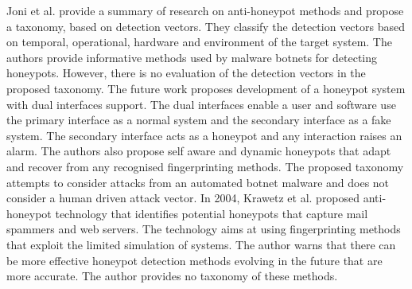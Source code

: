 \documentclass[../main.tex]{subfiles}
\begin{document}
Joni et al. \cite{Joni} provide a  summary of research on anti-honeypot methods and propose a taxonomy, based on detection vectors. They classify the detection vectors based on temporal, operational, hardware and environment of the target system. The authors provide informative methods used by malware botnets for detecting honeypots. However, there is no evaluation of the detection vectors in the proposed taxonomy. The future work proposes development of a honeypot system with dual interfaces support. The dual interfaces enable a user and software use the primary interface as a normal system and the secondary interface as a fake system. The secondary interface acts as a honeypot and any interaction raises an alarm. The authors also propose self aware and dynamic honeypots that adapt and recover from any recognised fingerprinting methods. The proposed taxonomy attempts to consider attacks from an automated botnet malware and does not consider a human driven attack vector. In 2004, Krawetz et al. \cite{krawetz2004anti} proposed anti-honeypot technology that identifies potential honeypots that capture mail spammers and web servers. The technology aims at using fingerprinting methods that exploit the limited simulation of systems. The author warns  that there can be more effective honeypot detection methods evolving in the future that are more accurate. The author provides no taxonomy of these methods. 
\end{document}
